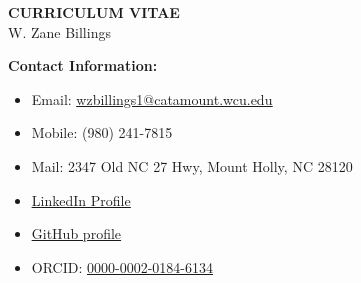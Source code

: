 \documentclass[11pt]{article}
\begin{document}
\begin{center}
\large{
	{\bf CURRICULUM VITAE} \\
	W. Zane Billings \\}
	\hrulefill
\end{center}

\normalsize

{\bf Contact Information:}
\begin{itemize}[noitemsep]
\item Email: \href{mailto:wzbillings1@catamount.wcu.edu}{\ul{wzbillings1@catamount.wcu.edu}}
\item Mobile: (980) 241-7815
\item Mail: 2347 Old NC 27 Hwy, Mount Holly, NC 28120
\item \href{https://www.linkedin.com/in/zane-b/}{\ul{LinkedIn Profile}}
\item \href{https://github.com/wz-billings}{\ul{GitHub profile}}
\item ORCID: \href{https://orcid.org/0000-0002-0184-6134}{\ul{0000-0002-0184-6134}}
\end{itemize}

\vspace{0.2in}


\vspace{0.2in}


\vspace{0.2in}


\vspace{0.2in}


\vspace{0.2in}


\vspace{0.2in}

\end{document}
